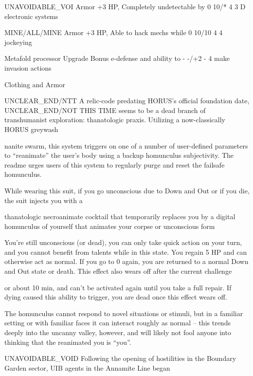  UNAVOIDABLE\_VOI           Armor       +3 HP, Completely undetectable by        0        10/*         4     3 
 D                                     electronic systems 

 MINE/ALL/MINE             Armor       +3 HP, Able to hack mechs while          0        10/10        4     4 
                                       jockeying 

 Metafold processor        Upgrade     Bonus e-defense and ability to           -        -/+2         -     4 
                                       make invasion actions 

                                               Clothing and Armor
 

UNCLEAR\_END/NTT  
A relic-code predating HORUS’s official foundation date, UNCLEAR\_END/NOT THIS TIME seems to be a  
dead branch of transhumanist exploration: thanatologic praxis. Utilizing a now-classically HORUS greywash  

nanite swarm, this system triggers on one of a number of user-defined parameters to “reanimate” the user’s  
body using a backup homunculus subjectivity. The readme urges users of this system to regularly purge  
and reset the failsafe homunculus.   

While wearing this suit, if you go unconscious due to Down and Out or if you die, the suit injects you with a  

thanatologic necroanimate cocktail that temporarily replaces you by a digital homunculus of yourself that  
animates your corpse or unconscious form
 

You’re still unconscious (or dead), you can only take quick action on your turn, and you cannot benefit  
from talents while in this state. You regain 5 HP and can otherwise act as normal. If you go to 0 again, you  
are returned to a normal Down and Out state or death. This effect also wears off after the current challenge  

or about 10 min, and can’t be activated again until you take a full repair. If dying caused this ability to  
trigger, you are dead once this effect wears off.
 

The homunculus cannot respond to novel situations or stimuli, but in a familiar setting or with familiar faces  
it can interact roughly as normal -- this trends deeply into the uncanny valley, however, and will likely not  
fool anyone into thinking that the reanimated you is “you”. 
 

UNAVOIDABLE\_VOID  
Following the opening of hostilities in the Boundary Garden sector, UIB agents in the Annamite Line began  

